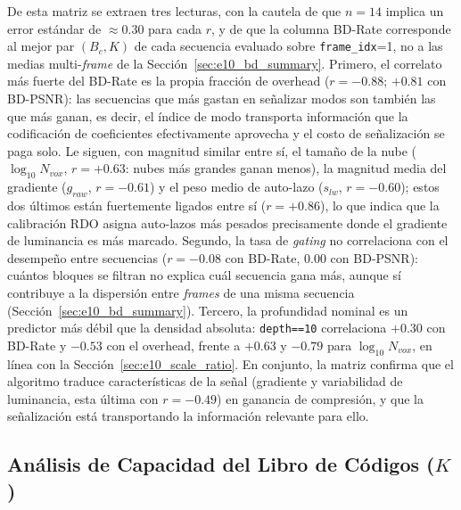 	De esta matriz se extraen tres lecturas, con la cautela de que $n=14$ implica un error estándar de $\approx0.30$ para cada $r$, y de que la columna BD-Rate corresponde al mejor par $(B_c,K)$ de cada secuencia evaluado sobre \texttt{frame\_idx}=1, no a las medias multi-\textit{frame} de la Sección~\ref{sec:e10_bd_summary}. Primero, el correlato más fuerte del BD-Rate es la propia fracción de overhead ($r=-0.88$; $+0.81$ con BD-PSNR): las secuencias que más gastan en señalizar modos son también las que más ganan, es decir, el índice de modo transporta información que la codificación de coeficientes efectivamente aprovecha y el costo de señalización se paga solo. Le siguen, con magnitud similar entre sí, el tamaño de la nube ($\log_{10}N_{vox}$, $r=+0.63$: nubes más grandes ganan menos), la magnitud media del gradiente ($g_{raw}$, $r=-0.61$) y el peso medio de auto-lazo ($s_{lw}$, $r=-0.60$); estos dos últimos están fuertemente ligados entre sí ($r=+0.86$), lo que indica que la calibración RDO asigna auto-lazos más pesados precisamente donde el gradiente de luminancia es más marcado. Segundo, la tasa de \textit{gating} no correlaciona con el desempeño entre secuencias ($r=-0.08$ con BD-Rate, $0.00$ con BD-PSNR): cuántos bloques se filtran no explica cuál secuencia gana más, aunque sí contribuye a la dispersión entre \textit{frames} de una misma secuencia (Sección~\ref{sec:e10_bd_summary}). Tercero, la profundidad nominal es un predictor más débil que la densidad absoluta: \texttt{depth==10} correlaciona $+0.30$ con BD-Rate y $-0.53$ con el overhead, frente a $+0.63$ y $-0.79$ para $\log_{10}N_{vox}$, en línea con la Sección~\ref{sec:e10_scale_ratio}. En conjunto, la matriz confirma que el algoritmo traduce características de la señal (gradiente y variabilidad de luminancia, esta última con $r=-0.49$) en ganancia de compresión, y que la señalización está transportando la información relevante para ello.

    \subsection{Análisis de Capacidad del Libro de Códigos ($K$)}
        \label{sec:e10_k_sweep}


